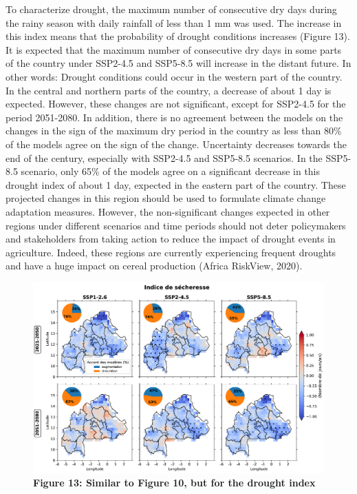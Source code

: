\documentclass[
]{book}
\begin{document}
To characterize drought, the maximum number of consecutive dry days during the rainy season with daily rainfall of less than 1 mm was used. The increase in this index means that the probability of drought conditions increases (Figure 13). It is expected that the maximum number of consecutive dry days in some parts of the country under SSP2-4.5 and SSP5-8.5 will increase in the distant future. In other words: Drought conditions could occur in the western part of the country. In the central and northern parts of the country, a decrease of about 1 day is expected. However, these changes are not significant, except for SSP2-4.5 for the period 2051-2080. In addition, there is no agreement between the models on the changes in the sign of the maximum dry period in the country as less than 80\% of the models agree on the sign of the change. Uncertainty decreases towards the end of the century, especially with SSP2-4.5 and SSP5-8.5 scenarios. In the SSP5-8.5 scenario, only 65\% of the models agree on a significant decrease in this drought index of about 1 day, expected in the eastern part of the country. These projected changes in this region should be used to formulate climate change adaptation measures. However, the non-significant changes expected in other regions under different scenarios and time periods should not deter policymakers and stakeholders from taking action to reduce the impact of drought events in agriculture. Indeed, these regions are currently experiencing frequent droughts and have a huge impact on cereal production (Africa RiskView, 2020).

\begin{figure}
\centering
\includegraphics{Figures and Photos/Figure 13.png}
\caption{\textbf{Figure 13: Similar to Figure 10, but for the drought index}}
\end{figure}
\end{document}
